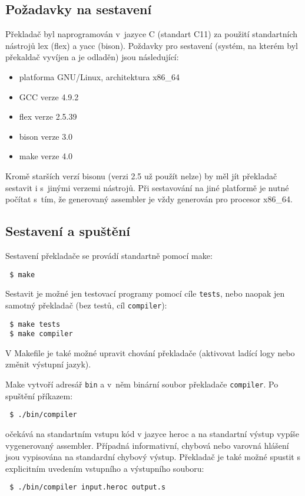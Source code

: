 \documentclass[a4paper,10pt]{article}
\begin{document}
\subsection{Požadavky na sestavení}
Překladač byl naprogramován v~jazyce C (standart C11) za použití standartních nástrojů lex (flex) a yacc (bison). Poždavky pro sestavení (systém, na kterém byl překaldač vyvíjen a je odladěn) jsou následující:
\begin{itemize}
 \item platforma GNU/Linux, architektura x86\_64
 \item GCC verze 4.9.2
 \item flex verze 2.5.39
 \item bison verze 3.0
 \item make verze 4.0
\end{itemize}
Kromě starších verzí bisonu (verzi 2.5 už použít nelze) by měl jít překladač sestavit i s~jinými verzemi nástrojů. Při sestavování na jiné platformě je nutné počítat s~tím, že generovaný assembler je vždy generován pro procesor x86\_64.

\subsection{Sestavení a spuštění}
Sestavení překladače se provádí standartně pomocí make:
\begin{lstlisting}
 $ make
\end{lstlisting}

Sestavit je možné jen testovací programy pomocí cíle \verb|tests|, nebo naopak jen samotný překladač (bez testů, cíl \verb|compiler|):
\begin{lstlisting}
 $ make tests
 $ make compiler
\end{lstlisting}
V Makefile je také možné upravit chování překladače (aktivovat ladící logy nebo změnit výstupní jazyk).

Make vytvoří adresář \verb|bin| a v~něm binární soubor překladače \verb|compiler|. Po spuštění příkazem: 
\begin{lstlisting}
 $ ./bin/compiler
\end{lstlisting}
očekává na standartním vstupu kód v jazyce heroc a na standartní výstup vypíše vygenerovaný assembler. Případná informativní, chybová nebo varovná hlášení jsou vypisována na standardní chybový výstup. Překladač je také možné spustit s explicitním uvedením vstupního a výstupního souboru:
\begin{lstlisting}
 $ ./bin/compiler input.heroc output.s
\end{lstlisting}
\end{document}
